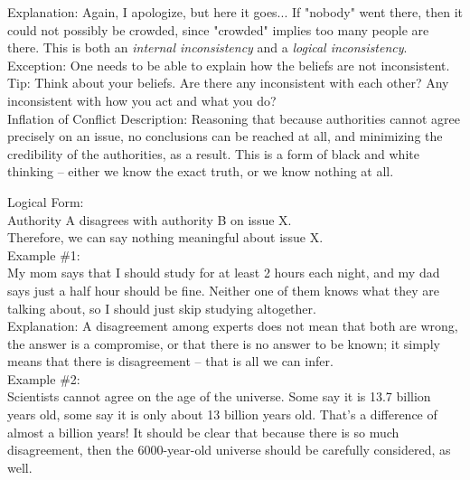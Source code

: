 \documentclass[a4paper,12pt,single,pdftex]{scrartcl}
\begin{document}
    
      Explanation: Again, I apologize, but here it goes... If "nobody" went there, then it could not possibly be crowded, since "crowded" implies too many people are there. This is both an {\it internal inconsistency} and a {\it logical inconsistency}.
    \\

    
      Exception: One needs to be able to explain how the beliefs are not inconsistent.
    \\

    
      Tip: Think about your beliefs.  Are there any inconsistent with each other?  Any inconsistent with how you act and what you do?
    \\

  

Inflation of Conflict
    Description: Reasoning that because authorities cannot agree precisely on an issue, no conclusions can be reached at all, and minimizing the credibility of the authorities, as a result.  This is a form of black and white thinking -- either we know the exact truth, or we know nothing at all. 

    
      Logical Form:
    \\

    
      Authority A disagrees with authority B on issue X.
    \\

    
      Therefore, we can say nothing meaningful about issue X.
    \\

    
      Example \#1:
    \\

    
      My mom says that I should study for at least 2 hours each night, and my dad says just a half hour should be fine.  Neither one of them knows what they are talking about, so I should just skip studying altogether.
    \\

    
      Explanation: A disagreement among experts does not mean that both are wrong, the answer is a compromise, or that there is no answer to be known; it simply means that there is disagreement -- that is all we can infer.
    \\

    
      Example \#2:
    \\

    
      Scientists cannot agree on the age of the universe.  Some say it is 13.7 billion years old, some say it is only about 13 billion years old.  That’s a difference of almost a billion years!  It should be clear that because there is so much disagreement, then the 6000-year-old universe should be carefully considered, as well.
    \\
\end{document}
